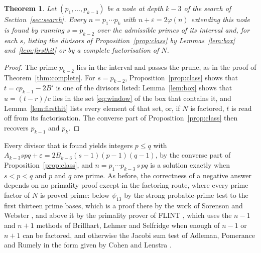 \documentclass[11pt,reqno]{amsart}
\numberwithin{equation}{section}
\theoremstyle{plain}
\newtheorem{theorem}{Theorem}[section]
\theoremstyle{definition}
\theoremstyle{remark}
\begin{document}
\begin{theorem}\label{thm:three}
Let $(p_1,\dots,p_{k-3})$ be a node at depth $k-3$ of the search of
Section~\ref{sec:search}. Every $n=p_1\cdots p_k$ with
$n+\varepsilon=2\varphi(n)$ extending this node is found by running
$s=p_{k-2}$ over the admissible primes of its interval and, for each
$s$, listing the divisors of Proposition~\ref{prop:class} by
Lemmas~\ref{lem:box} and~\ref{lem:firsthit} or by a complete
factorisation of $N$.
\end{theorem}

\begin{proof}
The prime $p_{k-2}$ lies in the interval and passes the prune, as in
the proof of Theorem~\ref{thm:complete}. For $s=p_{k-2}$,
Proposition~\ref{prop:class} shows that $t=cp_{k-1}-2B'$ is one of the
divisors listed: Lemma~\ref{lem:box} shows that $u=(t-r)/c$ lies in
the set \eqref{eq:window} of the box that contains it, and
Lemma~\ref{lem:firsthit} lists every element of that set, or, if
$N$ is factored, $t$ is read off from its factorisation. The converse part of
Proposition~\ref{prop:class} then recovers $p_{k-1}$ and $p_k$.
\end{proof}

Every divisor that is found yields integers $p\le q$ with
$A_{k-3}spq+\varepsilon=2B_{k-3}(s-1)(p-1)(q-1)$, by the converse part
of Proposition~\ref{prop:class}, and $n=p_1\cdots p_{k-3}\,s\,pq$ is a
solution exactly when $s<p<q$ and $p$ and $q$ are prime. As before, the correctness of a
negative answer depends on no primality proof except in the factoring
route, where every prime factor of $N$ is proved prime: below
$\psi_{13}$ by the strong probable-prime test to the first thirteen
prime bases, which is a proof there by the work of Sorenson and
Webster \cite{SW17}, and above it by the primality prover of FLINT
\cite{FLINT}, which uses the $n-1$ and $n+1$ methods of Brillhart,
Lehmer and Selfridge \cite{BLS75} when enough of $n-1$ or $n+1$ can be
factored, and otherwise the Jacobi sum test of Adleman, Pomerance and
Rumely \cite{APR83} in the form given by Cohen and Lenstra \cite{CL84}.
\end{document}
